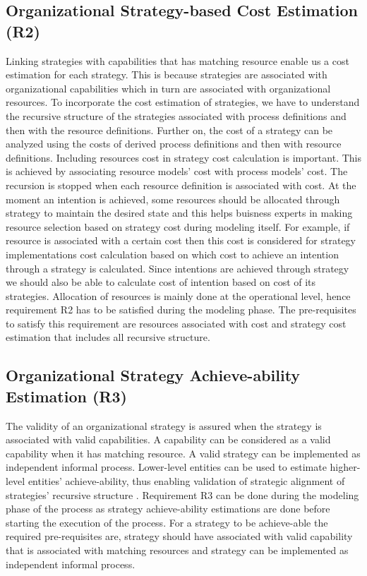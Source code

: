 \subsection{Organizational Strategy-based Cost Estimation (R2)}
Linking strategies with capabilities that has matching resource enable us a cost estimation for each strategy. This is because strategies are associated with organizational capabilities which in turn are associated with organizational resources. To incorporate the cost estimation of strategies, we have to understand the recursive structure of the strategies associated with process definitions and then with the resource definitions. Further on, the cost of a strategy can be analyzed using the costs of derived process definitions and then with resource definitions. Including resources cost in strategy cost calculation is important. This is achieved by associating resource models' cost with process models' cost. The recursion is stopped when each resource definition is associated with cost. At the moment an intention is achieved, some resources should be allocated through strategy to maintain the desired state \cite{Mandic2010} and this helps buisness experts in making resource selection based on strategy cost during modeling itself. For example, if resource is associated with a certain cost then this cost is considered for strategy implementations cost calculation based on which cost to achieve an intention through a strategy is calculated. Since intentions are achieved through strategy we should also be able to calculate cost of intention based on cost of its strategies. Allocation of resources is mainly done at the operational level, hence requirement R2 has to be satisfied during the modeling phase. The pre-requisites to satisfy this requirement are resources associated with cost and strategy cost estimation that includes all recursive structure.

\subsection{Organizational Strategy Achieve-ability Estimation (R3)}
 The validity of an organizational strategy is assured when the strategy is associated with valid capabilities. A capability can be considered as a valid capability when it has matching resource. A valid strategy can be implemented as independent informal process. Lower-level entities can be used to estimate higher-level entities' achieve-ability, thus enabling validation of strategic alignment of strategies' recursive structure \cite{Bleistein2006}. Requirement R3  can be done during the modeling phase of the process as strategy achieve-ability estimations are done before starting the execution of the process. For a strategy to be achieve-able the required pre-requisites are, strategy should have associated with valid capability that is associated with matching resources and strategy can be implemented as independent informal process.
 
